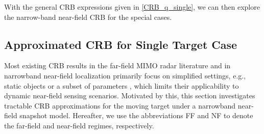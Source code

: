 \documentclass[9pt,final,journal,twocolumn]{IEEEtran}
\newtheorem{remark}{Remark}
\begin{document}
With the general CRB expressions given in \eqref{CRB_q_single}, we can then explore the narrow-band near-field CRB for the special cases. 
%
%
%
\vspace{-0.2cm}
\subsection{Approximated CRB for Single Target Case}
\vspace{-0.1cm}
Most existing CRB results in the far-field MIMO radar literature and in narrowband near-field localization primarily focus on simplified settings, e.g., static objects or a subset of parameters \cite{liang2021CramerRao}, which limits their applicability to dynamic near-field sensing scenarios. Motivated by this, this section investigates tractable CRB approximations for the moving target under a narrowband near-field snapshot model. Hereafter, we use the abbreviations FF and NF to denote the far-field and near-field regimes, respectively.
%
\end{document}
